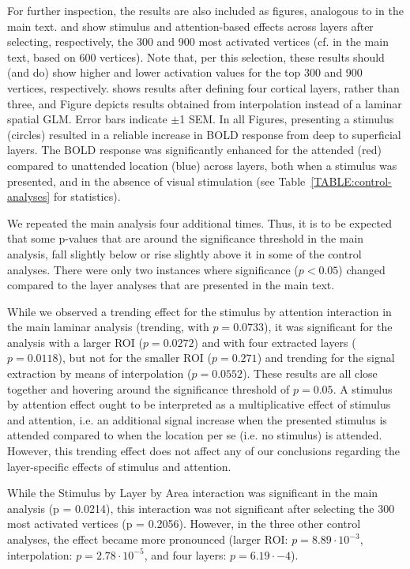 \documentclass[9pt,lineno]{aperture}
\begin{document}
\begin{appendixbox}
For further inspection, the results are also included as figures, analogous to  in the main text.  and  show stimulus and attention-based effects across layers after selecting, respectively, the 300 and 900 most activated vertices (cf.  in the main text, based on 600 vertices). Note that, per this selection, these results should (and do) show higher and lower activation values for the top 300 and 900 vertices, respectively. 
 shows results after defining four cortical layers, rather than three, and Figure  depicts results obtained from interpolation instead of a laminar spatial GLM. Error bars indicate $\pm$1 SEM. 
In all Figures, presenting a stimulus (circles) resulted in a reliable increase in BOLD response from deep to superficial layers. The BOLD response was significantly enhanced for the attended (red) compared to unattended location (blue) across layers, both when a stimulus was presented, and in the absence of visual stimulation (see Table~\ref{TABLE:control-analyses} for statistics). 

We repeated the main analysis four additional times. Thus, it is to be expected that some p-values that are around the significance threshold in the main analysis, fall slightly below or rise slightly above it in some of the control analyses. There were only two instances where significance ($p < 0.05$) changed compared to the layer analyses that are presented in the main text. 

While we observed a trending effect for the stimulus by attention interaction in the main laminar analysis (trending, with $p=0.0733$), it was significant for the analysis with a larger ROI ($p=0.0272$) and with four extracted layers ($p=0.0118$), but not for the smaller ROI ($p=0.271$) and trending for the signal extraction by means of interpolation ($p=0.0552$). These results are all close together and hovering around the significance threshold of $p=0.05$. A stimulus by attention effect ought to be interpreted as a multiplicative effect of stimulus and attention, i.e. an additional signal increase when the presented stimulus is attended compared to when the location per se (i.e. no stimulus) is attended. However, this trending effect does not affect any of our conclusions regarding the layer-specific effects of stimulus and attention. 

While the Stimulus by Layer by Area interaction was significant in the main analysis (p = 0.0214), this interaction was not significant after selecting the 300 most activated vertices (p = 0.2056). However, in the three other control analyses, the effect became more pronounced (larger ROI: $p=8.89\cdot10^{-3}$, interpolation: $p=2.78\cdot10^{-5}$, and four layers: $p=6.19\cdot{-4}$). 
\end{appendixbox}
\end{document}
